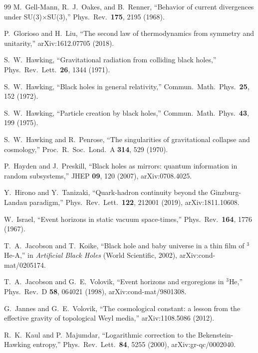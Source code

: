 \documentclass[aps,prd,nofootinbib,superscriptaddress,12pt]{revtex4-2}
\begin{document}
\begin{thebibliography}{99}
M.~Gell-Mann, R.~J.~Oakes, and B.~Renner,
``Behavior of current divergences under SU(3)$\times$SU(3),''
Phys.\ Rev.\ \textbf{175}, 2195 (1968).

P.~Glorioso and H.~Liu,
``The second law of thermodynamics from symmetry and unitarity,''
arXiv:1612.07705 (2018).

S.~W.~Hawking,
``Gravitational radiation from colliding black holes,''
Phys.\ Rev.\ Lett.\ \textbf{26}, 1344 (1971).

S.~W.~Hawking,
``Black holes in general relativity,''
Commun.\ Math.\ Phys.\ \textbf{25}, 152 (1972).

S.~W.~Hawking,
``Particle creation by black holes,''
Commun.\ Math.\ Phys.\ \textbf{43}, 199 (1975).

S.~W.~Hawking and R.~Penrose,
``The singularities of gravitational collapse and cosmology,''
Proc.\ R.\ Soc.\ Lond.\ A \textbf{314}, 529 (1970).

P.~Hayden and J.~Preskill,
``Black holes as mirrors: quantum information in random subsystems,''
JHEP \textbf{09}, 120 (2007),
arXiv:0708.4025.

Y.~Hirono and Y.~Tanizaki,
``Quark-hadron continuity beyond the Ginzburg-Landau paradigm,''
Phys.\ Rev.\ Lett.\ \textbf{122}, 212001 (2019),
arXiv:1811.10608.

W.~Israel,
``Event horizons in static vacuum space-times,''
Phys.\ Rev.\ \textbf{164}, 1776 (1967).

T.~A.~Jacobson and T.~Koike,
``Black hole and baby universe in a thin film of $^3$He-A,''
in \emph{Artificial Black Holes} (World Scientific, 2002),
arXiv:cond-mat/0205174.

T.~A.~Jacobson and G.~E.~Volovik,
``Event horizons and ergoregions in $^{3}$He,''
Phys.\ Rev.\ D \textbf{58}, 064021 (1998),
arXiv:cond-mat/9801308.

G.~Jannes and G.~E.~Volovik,
``The cosmological constant: a lesson from the effective gravity of
topological Weyl media,''
arXiv:1108.5086 (2012).

R.~K.~Kaul and P.~Majumdar,
``Logarithmic correction to the Bekenstein-Hawking entropy,''
Phys.\ Rev.\ Lett.\ \textbf{84}, 5255 (2000),
arXiv:gr-qc/0002040.


\end{thebibliography}
\end{document}
